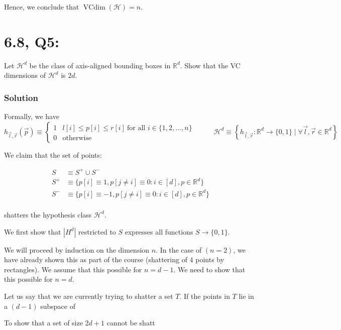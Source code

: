 \documentclass[11pt]{article}
\newcommand{\R}{\ensuremath{\mathbb R}}
\renewcommand{\H}{\ensuremath{\mathcal{H}}}
\DeclareMathOperator{\vcdim}{VCdim}
\newcommand{\vc}{\ensuremath{\vcdim}}
\begin{document}
Hence, we conclude that $\vc(\H) = n$.

\section*{6.8, Q5:}
Let $\H^d$ be the class of axis-aligned bounding boxes in $\R^d$. Show that
the VC dimensions of $\H^d$ is $2d$.


\subsubsection*{Solution}
Formally, we have 
$$
h_{\vec l, \vec r}(\vec p) \equiv
\begin{cases}
1 &  l[i] \leq p[i] \leq r[i]~\text{for all $i \in \{1, 2, \dots, n \}$ } \\
0 & \text{otherwise}
\end{cases} \qquad
\H^d \equiv \left\{ h_{\vec l, \vec r}: \R^d \rightarrow \{0, 1\} \mid \forall \vec l, \vec r \in \mathbb R^d \right\}
$$

We claim that the set of points:

\begin{align*}
S &\equiv S^+ \cup S^- \\
S^+ &\equiv \{ p[i] \equiv 1, p[j \neq i] \equiv 0 : i \in [d], p \in \R^d \} \\
S^- &\equiv \{ p[i] \equiv -1, p[j \neq i] \equiv 0 : i \in [d], p \in \R^d  \} \\
\end{align*}

shatters the hypothesis class $\H^d$.

We first show that $|H^d|$ restricted to $S$ expresses all functions $S \rightarrow \{0, 1\}$.

We will proceed by induction on the dimension $n$.
In the case of $(n = 2)$, we have already shown
this as part of the course (shattering of 4 points by rectangles). We assume that this
possible for $n=d-1$. We need to show that this possible for $n = d$.

Let us say that we are currently trying to shatter a set $T$. If the points
in $T$ lie in a $(d-1)$ subspace of 


To show that a set of size $2d+1$ cannot be shatt
\end{document}

